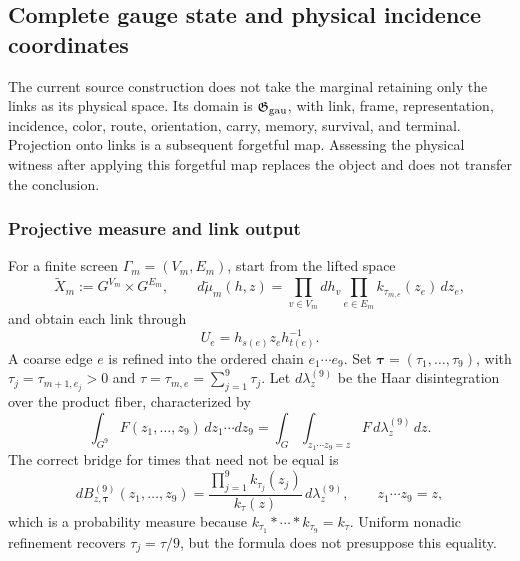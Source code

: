 \subsection{Complete gauge state and physical incidence coordinates}

The current source construction does not take the marginal retaining only
the links as its physical space. Its domain is $\mathfrak G_{\rm gau}$, with link, frame,
representation, incidence, color, route, orientation,
carry, memory, survival, and terminal. Projection onto links is a subsequent
forgetful map. Assessing the physical witness after applying this forgetful map replaces the
object and does not transfer the conclusion.

\subsubsection{Projective measure and link output}

For a finite screen $\Gamma_m=(V_m,E_m)$, start from the lifted space
\begin{equation}\label{eq:pdf2-ym-owner-lifted-space}
 \widetilde X_m:=G^{V_m}\times G^{E_m},\qquad
 d\widetilde\mu_m(h,z)
 =\prod_{v\in V_m}dh_v\prod_{e\in E_m}k_{\tau_{m,e}}(z_e)\,dz_e,
\end{equation}
and obtain each link through
\begin{equation}\label{eq:pdf2-ym-owner-link-publication}
 U_e=h_{s(e)}z_eh_{t(e)}^{-1}.
\end{equation}
A coarse edge $e$ is refined into the ordered chain
$e_1\cdots e_9$. Set
\(\boldsymbol\tau=(\tau_1,\ldots,\tau_9)\), with
\(\tau_j=\tau_{m+1,e_j}>0\) and
\(\tau=\tau_{m,e}=\sum_{j=1}^9\tau_j\). Let
\(d\lambda_z^{(9)}\) be the Haar disintegration over the product fiber,
characterized by
\[
 \int_{G^9}F(z_1,\ldots,z_9)\,dz_1\cdots dz_9
 =\int_G\int_{z_1\cdots z_9=z}
   F\,d\lambda_z^{(9)}\,dz.
\]
The correct bridge for times that need not be equal is
\begin{equation}\label{eq:pdf2-ym-owner-heat-bridge}
 dB_{z,\boldsymbol\tau}^{(9)}(z_1,\ldots,z_9)
 =\frac{\prod_{j=1}^9k_{\tau_j}(z_j)}{k_\tau(z)}
   \,d\lambda_z^{(9)},
 \qquad z_1\cdots z_9=z,
\end{equation}
which is a probability measure because
\(k_{\tau_1}*\cdots*k_{\tau_9}=k_\tau\). Uniform nonadic refinement
recovers \(\tau_j=\tau/9\), but the formula does not presuppose this equality.

